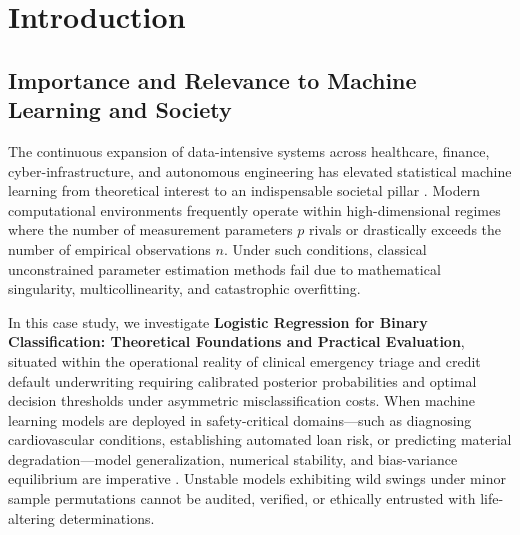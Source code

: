 \section{Introduction}

\subsection{Importance and Relevance to Machine Learning and Society}
The continuous expansion of data-intensive systems across healthcare, finance, cyber-infrastructure, and autonomous engineering has elevated statistical machine learning from theoretical interest to an indispensable societal pillar \cite{hastie2009}. Modern computational environments frequently operate within high-dimensional regimes where the number of measurement parameters $p$ rivals or drastically exceeds the number of empirical observations $n$. Under such conditions, classical unconstrained parameter estimation methods fail due to mathematical singularity, multicollinearity, and catastrophic overfitting.

In this case study, we investigate \textbf{Logistic Regression for Binary Classification: Theoretical Foundations and Practical Evaluation}, situated within the operational reality of clinical emergency triage and credit default underwriting requiring calibrated posterior probabilities and optimal decision thresholds under asymmetric misclassification costs. When machine learning models are deployed in safety-critical domains---such as diagnosing cardiovascular conditions, establishing automated loan risk, or predicting material degradation---model generalization, numerical stability, and bias-variance equilibrium are imperative \cite{breiman2001}. Unstable models exhibiting wild swings under minor sample permutations cannot be audited, verified, or ethically entrusted with life-altering determinations.

